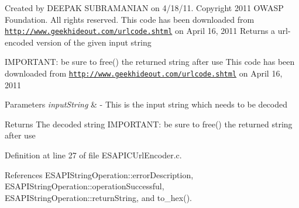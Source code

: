 Created by DEEPAK SUBRAMANIAN on 4/18/11. Copyright 2011 OWASP Foundation. All rights reserved. This code has been downloaded from \href{http://www.geekhideout.com/urlcode.shtml}{\tt http://www.geekhideout.com/urlcode.shtml} on April 16, 2011 Returns a url-\/encoded version of the given input string

IMPORTANT: be sure to free() the returned string after use This code has been downloaded from \href{http://www.geekhideout.com/urlcode.shtml}{\tt http://www.geekhideout.com/urlcode.shtml} on April 16, 2011


\begin{DoxyParams}{Parameters}
{\em inputString} & -\/ This is the input string which needs to be decoded \\
\hline
\end{DoxyParams}
\begin{DoxyReturn}{Returns}
The decoded string IMPORTANT: be sure to free() the returned string after use 
\end{DoxyReturn}


Definition at line 27 of file ESAPICUrlEncoder.c.



References ESAPIStringOperation::errorDescription, ESAPIStringOperation::operationSuccessful, ESAPIStringOperation::returnString, and to\_\-hex().

